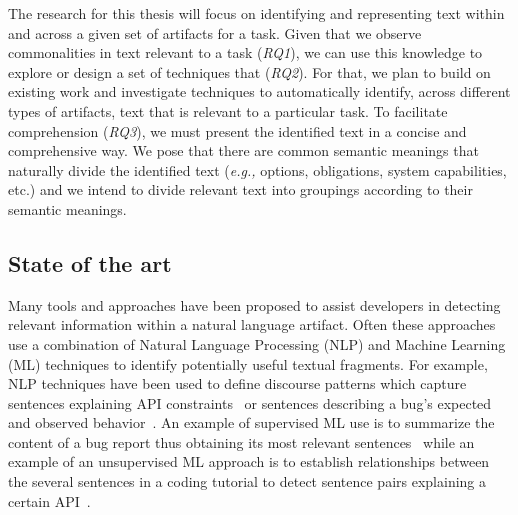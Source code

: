 The research for this thesis will focus on identifying and representing text within and across a given set of artifacts for a task.
Given that we observe commonalities in text relevant to a task (\textit{RQ1}), we can use this knowledge to explore or design a set of techniques
that  (\textit{RQ2}).
For that, we plan to build on existing work and investigate techniques to automatically identify, across different types of artifacts, text that is relevant to a particular task.
To facilitate comprehension (\textit{RQ3}), we must present the identified text in a concise and comprehensive way.
We pose that there are common semantic meanings that naturally divide the identified text (\textit{e.g.,} options, obligations, system capabilities, etc.)
and we intend to divide relevant text into groupings according to their semantic meanings.





\subsection{State of the art}


Many tools and approaches have been proposed to assist developers in detecting relevant information within a natural language artifact.
Often these approaches use a combination of Natural Language Processing (NLP) and Machine Learning (ML) techniques to identify potentially useful textual fragments.
For example, NLP techniques have been used to define discourse patterns
which capture
sentences explaining API constraints~\cite{Robillard2015} or
sentences describing a bug's expected and observed behavior~\cite{Chaparro2017}.
An example of supervised ML use is to
summarize the content of a bug report
thus obtaining its most relevant sentences~\cite{Rastkar2010}
while an example of an unsupervised
ML approach is to establish relationships between the several sentences in a coding tutorial
to detect sentence pairs explaining a certain API~\cite{Jiang2017}.



